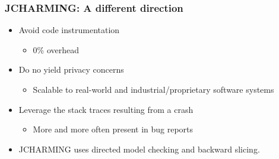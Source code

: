 \documentclass{beamer}
\begin{document}
\begin{frame}
\frametitle{JCHARMING: A different direction}
\begin{itemize}

\item Avoid code instrumentation
\begin{itemize}
\vspace{0.3cm}
\item 0\% overhead
\end{itemize}
\vspace{0.3cm}
\item Do no yield privacy concerns
\begin{itemize}
\vspace{0.3cm}
\item Scalable to real-world and industrial/proprietary software systems
\end{itemize}
\vspace{0.3cm}
\item Leverage the stack traces resulting from a crash
\begin{itemize}
\vspace{0.3cm}
\item More and more often present in bug reports
\end{itemize}
\vspace{0.3cm}
\item JCHARMING uses directed model checking and backward slicing.
\end{itemize}
\end{frame}

\end{document}

